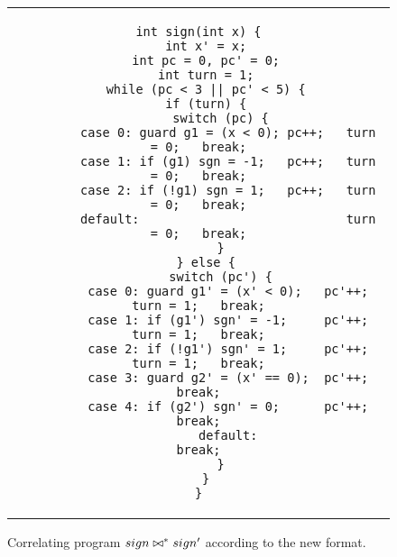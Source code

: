 \begin{figure}[H]
\centering
\begin{tabular}{c}
\begin{lstlisting}
int sign(int x) {
  int x' = x;
  int pc = 0, pc' = 0;
  int turn = 1;
  while (pc < 3 || pc' < 5) {
  if (turn) {
      switch (pc) {
        case 0: guard g1 = (x < 0); pc++;   turn = 0;   break;
        case 1: if (g1) sgn = -1;   pc++;   turn = 0;   break;
        case 2: if (!g1) sgn = 1;   pc++;   turn = 0;   break;
        default:                            turn = 0;   break;
      }
  } else {
      switch (pc') {
        case 0: guard g1' = (x' < 0);   pc'++;   turn = 1;   break;
        case 1: if (g1') sgn' = -1;     pc'++;   turn = 1;   break;
        case 2: if (!g1') sgn' = 1;     pc'++;   turn = 1;   break;
        case 3: guard g2' = (x' == 0);  pc'++;               break;
        case 4: if (g2') sgn' = 0;      pc'++;               break;
        default:                                             break;
      }
  }
}
\end{lstlisting}
\end{tabular}
\caption{Correlating program $sign \bowtie^* sign'$ according to the new format.}
\end{figure} 